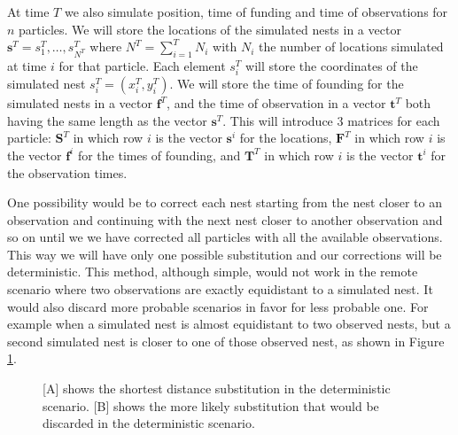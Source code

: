 \documentclass[11pt,a4paper]{article}
\renewcommand{\vec}[1]{\mathbf{#1}}
\begin{document}
{At time $T$ we also simulate position, time of funding and time of observations for $n$ particles. We will store the locations of the simulated nests in a vector $\vec{s}^T = s^T_1, \dots, s^T_{N^T}$ where $N^T = \sum_{i = 1}^T N_i$ with $N_i$ the number of locations simulated at time $i$ for that particle. Each element $s^T_i$ will store the coordinates of the simulated nest $s^T_i = {(x^T_i, y^T_i)}$. We will store the time of founding for the simulated nests in a vector $\vec{f}^T$, and the time of observation in a vector $\vec{t}^T$ both having the same length as the vector $\vec{s}^T$. This will introduce 3 matrices for each particle: $\vec{S}^T$ in which row $i$ is the vector $\vec{s}^i$ for the locations, $\vec{F}^T$ in which row $i$ is the vector $\vec{f}^i$ for the times of founding, and $\vec{T}^T$ in which row $i$ is the vector $\vec{t}^i$ for the observation times.

One possibility would be to correct each nest starting from the nest closer to an observation and continuing with the next nest closer to another observation and so on until we we have corrected all particles with all the available observations. This way we will have only one possible substitution and our corrections will be deterministic. This method, although simple, would not work in the remote scenario where two observations are exactly equidistant to a simulated nest. It would also discard more probable scenarios in favor for less probable one. For example when a simulated nest is almost equidistant to two observed nests, but a second simulated nest is closer to one of those observed nest, as shown in Figure \ref{fig:1}.


\begin{figure}
\centering
\caption{[A] shows the shortest distance substitution in the deterministic scenario. [B] shows the more likely substitution that would be discarded in the deterministic scenario.}
\label{fig:1}
\end{figure}

}
\end{document}
